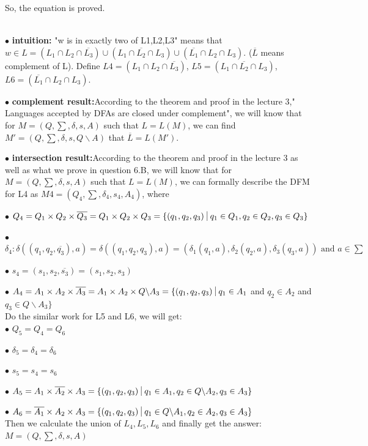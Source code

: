 \documentclass[12pt,a4paper]{article}
\newcommand{\question}[1]{\bigskip\noindent{\textbf{Q{#1} solution}}}
\begin{document}
So, the equation is proved.


\question{6.C}\\

	$\bullet$ \textbf{intuition:} "w is in exactly two of {L1,L2,L3}" means that $w \in L = (L_1 \cap L_2 \cap \overline{L_3}) \cup ( L_1 \cap \overline{L_2} \cap L_3) \cup (\overline{L_1} \cap L_2 \cap L_3)$. ($\overline{L}$ means complement of L). Define $L4=(L_1 \cap L_2 \cap \overline{L_3})$, $L5=( L_1 \cap \overline{L_2} \cap L_3)$, $L6 = (\overline{L_1} \cap L_2 \cap L_3)$.


	$\bullet$ \textbf{complement result:}According to the theorem and proof in the lecture 3," Languages accepted by DFAs are closed under complement", we will know that for $M = (Q,\sum,\delta,s,A)$ such that $L=L(M)$, we can find $M' = (Q,\sum,\delta,s,Q \backslash A)$ that $\overline{L}=L(M')$. 


	$\bullet$ \textbf{intersection result:}According to the theorem and proof in the lecture 3 as well as what we prove in question 6.B, we will know that for $M = (Q,\sum,\delta,s,A)$ such that $L=L(M)$, we can formally describe the DFM for L4 as  $M4 = (Q_{4},\sum,\delta_{4},s_{4},A_{4})$, where

	$\bullet$ $Q_4 = Q_1 \times Q_2 \times \overline{Q_3} =  Q_1 \times Q_2 \times Q_3 =\{(q_1,q_2,q_3)\ \vline\ q_1 \in Q_1, q_2 \in Q_2, q_3 \in Q_3\}$

	$\bullet$ $\delta_4: \delta((q_1,q_2,\overline{q_3}),a) = \delta((q_1,q_2,q_3),a) = (\delta_1(q_1,a),\delta_2(q_2,a),\delta_3(q_3,a)) \mbox{ and } a \in \sum$

	$\bullet$ $s_4 = (s_1,s_2,\overline{s_3}) = (s_1,s_2,s_3)$

	$\bullet$ $A_4 = A_1 \times A_2 \times \overline{A_3} = A_1 \times A_2 \times Q \backslash A_3 = \{(q_1,q_2,q_3)\ \vline\ q_1 \in A_1$ and $q_2 \in A_2$ and $q_3 \in Q \backslash A_3\}$\\
	{Do the similar work for L5 and L6, we will get:}\\


	$\bullet$ $Q_5 = Q_4 = Q_6 $

	$\bullet$ $\delta_5 = \delta_4 = \delta_6$

	$\bullet$ $s_5 = s_4 = s_6$

	$\bullet$ $A_5 = A_1 \times \overline{A_2} \times A_3 = \{(q_1,q_2,q_3)\ \vline\ q_1 \in A_1, q_2 \in Q \backslash A_2, q_3 \in A_3\}$

	$\bullet$ $A_6 = \overline{A_1} \times A_2 \times A_3 = \{(q_1,q_2,q_3)\ \vline\ q_1 \in Q \backslash A_1, q_2 \in A_2, q_3 \in A_3\}$\\
	{Then we calculate the union of $L_4,L_5,L_6$ and finally get the answer: $M = (Q,\sum,\delta,s,A)$}\\
	
\end{document}
